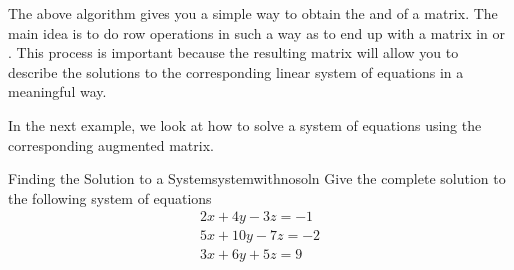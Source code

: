 


The above algorithm gives you a simple way to obtain the \ef \;and \rref \;of a matrix.
The main idea is to do row operations in such a way as to end up with a
matrix in \ef \;or \rref. This process is important because the resulting matrix will 
allow you to describe the
solutions to the corresponding linear system of equations in a meaningful way. 

In the next example, we look at how to solve a system of equations using the corresponding augmented matrix.

\begin{example}{Finding the Solution to a System}{systemwithnosoln}
Give the complete solution to the following system of equations \:
\begin{equation*}
\begin{array}{c}
2x+4y-3z=-1\\
5x+10y-7z=-2\\
3x+6y+5z=9
\end{array}
\end{equation*}
\end{example}


